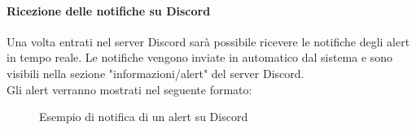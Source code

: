\paragraph{Ricezione delle notifiche su Discord}
Una volta entrati nel server Discord sarà possibile ricevere le notifiche degli alert in tempo reale. Le notifiche vengono inviate in automatico dal sistema e sono visibili nella sezione "informazioni/alert" del server Discord.\\
Gli alert verranno mostrati nel seguente formato:
\begin{figure}[H]
    \centering
    \caption{Esempio di notifica di un alert su Discord}
    \label{fig:my_label}
\end{figure}